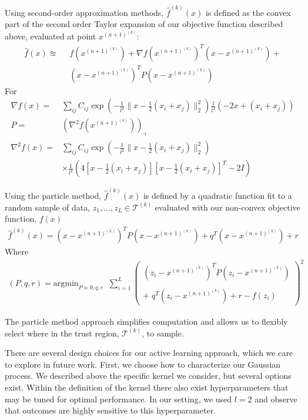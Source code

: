 \documentclass[10pt,twocolumn,letterpaper]{article}
\begin{document}
Using second-order approximation methods, $\hat{f}^{(k)}(x)$ is defined as the convex part of the second order Taylor expansion of our objective function described above, evaluated at point $x^{(n+1)^{(k)}}$:
\begin{align*}
    \hat{f}(x) \approxeq&\;\; f\left(x^{(n+1)^{(k)}}\right) + \nabla f\left(x^{(n+1)^{(k)}}\right)^T\left(x - x^{(n+1)^{(k)}}\right) +\\
     &\;\;\left(x - x^{(n+1)^{(k)}}\right)^T P \left(x - x^{(n+1)^{(k)}}\right)
\end{align*}
For
\begin{align*}
    \nabla f(x) =& \sum_{ij} C_{ij} \exp\left(-\frac{1}{l^2}\lVert x - \frac{1}{2}(x_i + x_j)\rVert ^2_2 \right) \frac{1}{l^2}\left(-2x + (x_i + x_j)\right)\\
    P =& \left(\nabla^2 f\left(x^{(n+1)^{(k)}}\right)\right)_+\\
    \nabla^2 f(x) =& \sum_{ij} C_{ij} \exp\left(-\frac{1}{l^2}\lVert x - \frac{1}{2}(x_i + x_j)\rVert ^2_2 \right)\\
    &\times \frac{1}{l^2}\left(4 \left[x - \frac{1}{2}(x_i + x_j)\right] \left[x - \frac{1}{2}(x_i + x_j)\right]^T -2I\right)
\end{align*}

Using the particle method, $\hat{f}^{(k)}(x)$ is defined by a quadratic function fit to a random sample of data, $z_1, \dots, z_L \in \mathcal{T}^{(k)}$ evaluated with our non-convex objective function, $f(x)$
\begin{align*}
    \hat{f}^{(k)}(x) = \left(x - x^{(n+1)^{(k)}}\right)^T P \left(x - x^{(n+1)^{(k)}}\right) + q^T\left(x - x^{(n+1)^{(k)}}\right) + r
\end{align*}
Where
\begin{align*}
    (P, q, r) = \text{argmin}_{P\succeq 0, q, r} \;\;  \sum_{i=1}^L \left(
        \begin{matrix}
            \left(z_i - x^{(n+1)^{(k)}}\right)^TP\left(z_i - x^{(n+1)^{(k)}}\right)\\\\
            +\; q^T\left(z_i - x^{(n+1)^{(k)}}\right) + r - f(z_i)
        \end{matrix} \right)^2
\end{align*}

The particle method approach simplifies computation and allows us to flexibly select where in the trust region, $\mathcal{T}^{(k)}$, to sample.

There are several design choices for our active learning approach, which we care to explore in future work. First, we choose how to characterize our Gaussian process. We described above the specific kernel we consider, but several options exist. Within the definition of the kernel there also exist hyperparameters that may be tuned for optimal performance. In our setting, we used $l=2$ and observe that outcomes are highly sensitive to this hyperparameter.
\end{document}
